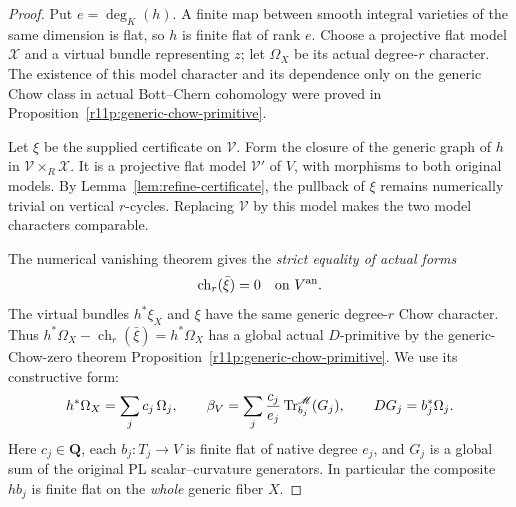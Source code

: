 \begin{proof}
Put $e=\deg_K(h)$.  A finite map between smooth integral varieties
of the same dimension is flat, so $h$ is finite flat of rank $e$.
Choose a projective flat model $\mathcal X$ and a virtual bundle
representing $z$; let $\Omega_X$ be its actual degree-$r$ character.
The existence of this model character and its dependence only on
the generic Chow class in actual Bott--Chern cohomology were proved
in Proposition~\ref{r11p:generic-chow-primitive}.

Let $\xi$ be the supplied certificate on $\mathcal V$.  Form the
closure of the generic graph of $h$ in
$\mathcal V\times_R\mathcal X$.  It is a projective flat model
$\mathcal V'$ of $V$, with morphisms to both original models.
By Lemma~\ref{lem:refine-certificate}, the pullback of $\xi$ remains
numerically trivial on vertical $r$-cycles.  Replacing
$\mathcal V$ by this model makes the two model characters
comparable.

The numerical vanishing theorem 
gives the \emph{strict equality of actual forms}
\[
                     \operatorname{ch}_r(\bar\xi)=0
                                \quad\text{on }V^{\mathrm{an}}.
\]
The virtual bundles $h^*\xi_X$ and $\xi$ have the same generic
degree-$r$ Chow character.  Thus
$h^*\Omega_X-\operatorname{ch}_r(\bar\xi)=h^*\Omega_X$
has a global actual $D$-primitive by the generic-Chow-zero theorem
Proposition~\ref{r11p:generic-chow-primitive}.  We use its constructive form:
\begin{equation}\label{eq:certificate-primitive}
 h^*\Omega_X=\sum_jc_j\,\Omega_j,
 \qquad
 \beta_V=\sum_j\frac{c_j}{e_j}
        \operatorname{Tr}^{\mathscr M}_{b_j}(G_j),
 \qquad
 DG_j=b_j^*\Omega_j.
\end{equation}
Here $c_j\in\mathbf Q$, each $b_j:T_j\to V$ is finite flat of
native degree $e_j$, and $G_j$ is a global sum of the original
PL scalar--curvature generators.  In particular the composite
$h b_j$ is finite flat on the \emph{whole} generic fiber $X$.


\end{proof}
